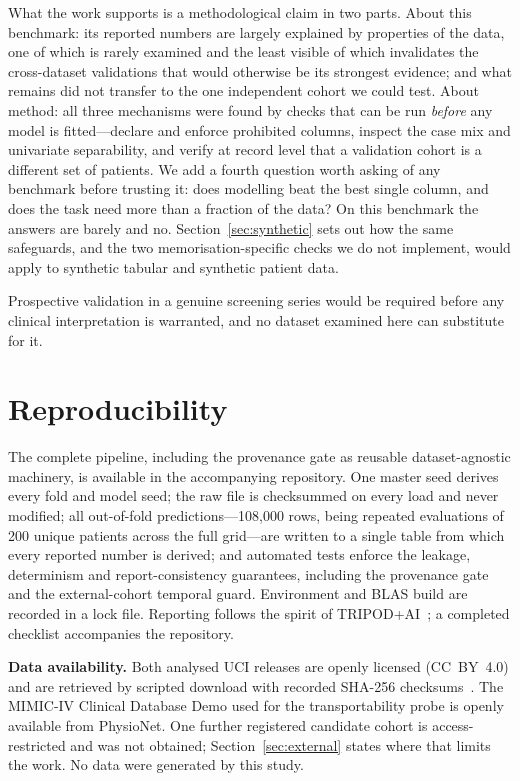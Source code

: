 \documentclass[conference]{IEEEtran}
\begin{document}
What the work supports is a methodological claim in two parts. About this
benchmark: its reported numbers are largely explained by properties of the
data, one of which is rarely examined and the least visible of which
invalidates the cross-dataset validations that would otherwise be its
strongest evidence; and what remains did not transfer to the one independent
cohort we could test. About method: all three mechanisms were found by checks
that can be run \emph{before} any model is fitted---declare and enforce prohibited columns, inspect the case mix and
univariate separability, and verify at record level that a validation cohort
is a different set of patients. We add a fourth question worth asking of any
benchmark before trusting it: does modelling beat the best single column, and
does the task need more than a fraction of the data? On this benchmark the
answers are barely and no. Section~\ref{sec:synthetic} sets out how the same
safeguards, and the two memorisation-specific checks we do not implement,
would apply to synthetic tabular and synthetic patient data.

Prospective validation in a genuine screening series would be required before
any clinical interpretation is warranted, and no dataset examined here can
substitute for it.

\section*{Reproducibility}

The complete pipeline, including the provenance gate as reusable
dataset-agnostic machinery, is available in the accompanying repository. One
master seed derives every fold and model seed; the raw file is checksummed on
every load and never modified; all out-of-fold predictions---108{,}000 rows,
being repeated evaluations of 200 unique patients across the full grid---are
written to a single table from which every reported number is derived; and \TestCount{}
automated tests enforce the leakage, determinism and report-consistency
guarantees, including the provenance gate and the external-cohort temporal
guard. Environment and BLAS build are recorded in a lock file. Reporting
follows the spirit of TRIPOD+AI~\cite{tripod2024}; a completed checklist
accompanies the repository.

\textbf{Data availability.} Both analysed UCI releases are openly licensed
(CC~BY~4.0) and are retrieved by scripted download with recorded SHA-256
checksums~\cite{uci2015,uci2023}. The MIMIC-IV Clinical Database Demo used
for the transportability probe is openly available from PhysioNet. One
further registered candidate cohort is access-restricted and was not
obtained; Section~\ref{sec:external} states where that limits the work. No
data were generated by this study.
\end{document}
